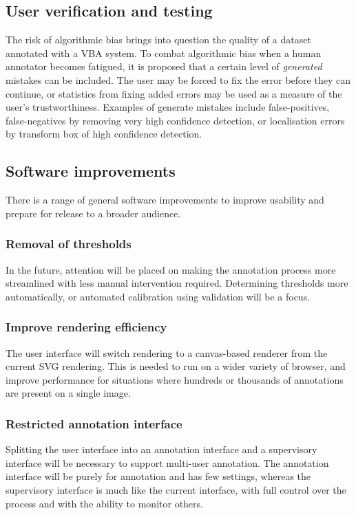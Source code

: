 \subsection{User verification and testing}
\label{sec:user_verification}

The risk of algorithmic bias brings into question the quality of a dataset annotated with a \gls{VBA} system.  To combat algorithmic bias when a human annotator becomes fatigued, it is proposed that a certain level of \emph{generated} mistakes can be included. The user may be forced to fix the error before they can continue, or statistics from fixing added errors may be used as a measure of the user's trustworthiness. Examples of generate mistakes include false-positives, false-negatives by removing very high confidence detection, or localisation errors by transform box of high confidence detection. 


\subsection{Software improvements}

There is a range of general software improvements to improve usability and prepare for release to a broader audience. 

\subsubsection {Removal of thresholds}
In the future, attention will be placed on making the annotation process more streamlined with less manual intervention required. Determining thresholds more automatically, or automated calibration using validation will be a focus.

\subsubsection {Improve rendering efficiency}
The user interface will switch rendering to a canvas-based renderer from the current SVG rendering. This is needed to run on a wider variety of browser, and improve performance for situations where hundreds or thousands of annotations are present on a single image.

\subsubsection {Restricted annotation interface}
Splitting the user interface into an annotation interface and a supervisory interface will be necessary to support multi-user annotation. The annotation interface will be purely for annotation and has few settings, whereas the supervisory interface is much like the current interface, with full control over the process and with the ability to monitor others.

